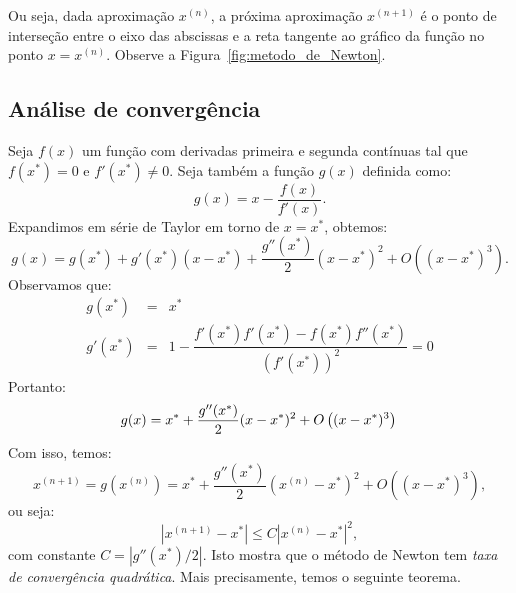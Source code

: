 \documentclass[
	12pt,				%
	oneside,			%
	a4paper,			%
	english,			%
	french,				%
	spanish,			%
	brazil				%
	]{abntex2}
\begin{document}
Ou seja, dada aproximação $x^{(n)}$, a próxima aproximação $x^{(n+1)}$ é o ponto de interseção entre o eixo das abscissas e a reta tangente ao gráfico da função no ponto $x = x^{(n)}$. Observe a Figura~\ref{fig:metodo_de_Newton}.

\subsection{Análise de convergência}\label{Analise_conv_Newton}

Seja $f(x)$ um função com derivadas primeira e segunda contínuas tal que $f(x^*)=0$ e $f'(x^*)\neq 0$. Seja também a função $g(x)$ definida como:
\begin{equation}
  g(x)=x-\dfrac{f(x)}{f'(x)}.
\end{equation}
Expandimos em série de Taylor em torno de $x = x^*$, obtemos:
\begin{equation}
  g(x)=g(x^*)+g'(x^*)(x-x^*) + \dfrac{g''(x^*)}{2}(x-x^*)^2 + O\left((x-x^*)^3\right).
\end{equation}
Observamos que:
\begin{eqnarray}
g(x^*) &=& x^*\\
g'(x^*) &=& 1 - \dfrac{f'(x^*)f'(x^*)-f(x^*)f''(x^*)}{\left(f'(x^*)\right)^2} = 0
\end{eqnarray}
Portanto:
\begin{equation}
g(x) = x^* + \dfrac{g''(x^*)}{2}(x-x^*)^2 + O\left((x-x^*)^3\right)\\
\end{equation}
Com isso, temos:
\begin{equation}
x^{(n+1)} = g(x^{(n)}) =  x^*+ \dfrac{g''(x^*)}{2}(x^{(n)}-x^*)^2 + O\left((x-x^*)^3\right),
\end{equation}
ou seja:
\begin{equation}
\left|x^{(n+1)}-x^*\right| \leq C\left|x^{(n)}-x^*\right|^2,
\end{equation}
com constante $C = \left|g''(x^*)/2\right|$. Isto mostra que o método de Newton tem \emph{taxa de convergência quadrática}. Mais precisamente, temos o seguinte teorema.
\end{document}
